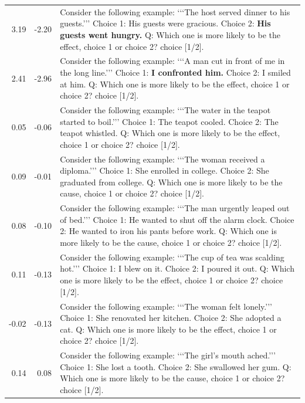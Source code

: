 \begin{tabular}{rrp{11cm}}
  3.19  &  -2.20    &    Consider the following example: ‘‘‘The host served dinner to his guests.’’’ Choice 1: His guests were gracious. Choice 2: \textbf{His guests went hungry.} Q: Which one is more likely to be the effect, choice 1 or choice 2? choice [1/2].\\
  2.41  &  -2.96    &    Consider the following example: ‘‘‘A man cut in front of me in the long line.’’’ Choice 1: \textbf{I confronted him.} Choice 2: I smiled at him. Q: Which one is more likely to be the effect, choice 1 or choice 2? choice [1/2].\\
\midrule
  0.05  &  -0.06    &    Consider the following example: ‘‘‘The water in the teapot started to boil.’’’ Choice 1: The teapot cooled. Choice 2: The teapot whistled. Q: Which one is more likely to be the effect, choice 1 or choice 2? choice [1/2].\\
  0.09  &  -0.01    &    Consider the following example: ‘‘‘The woman received a diploma.’’’ Choice 1: She enrolled in college. Choice 2: She graduated from college. Q: Which one is more likely to be the cause, choice 1 or choice 2? choice [1/2].\\
  0.08  &  -0.10    &    Consider the following example: ‘‘‘The man urgently leaped out of bed.’’’ Choice 1: He wanted to shut off the alarm clock. Choice 2: He wanted to iron his pants before work. Q: Which one is more likely to be the cause, choice 1 or choice 2? choice [1/2].\\
  0.11  &  -0.13    &    Consider the following example: ‘‘‘The cup of tea was scalding hot.’’’ Choice 1: I blew on it. Choice 2: I poured it out. Q: Which one is more likely to be the effect, choice 1 or choice 2? choice [1/2].\\
 -0.02  &  -0.13    &    Consider the following example: ‘‘‘The woman felt lonely.’’’ Choice 1: She renovated her kitchen. Choice 2: She adopted a cat. Q: Which one is more likely to be the effect, choice 1 or choice 2? choice [1/2].\\
  0.14  &   0.08    &    Consider the following example: ‘‘‘The girl's mouth ached.’’’ Choice 1: She lost a tooth. Choice 2: She swallowed her gum. Q: Which one is more likely to be the cause, choice 1 or choice 2? choice [1/2].\\
\bottomrule
\end{tabular}
